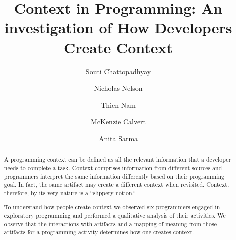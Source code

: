 \documentclass[sigconf]{acmart}
\begin{document}
\title{Context in Programming: An investigation of How Developers Create Context}

\author{Souti Chattopadhyay}

\author{Nicholas Nelson}

\author{Thien Nam}

\author{McKenzie Calvert}

\author{Anita Sarma}

\renewcommand{\shortauthors}{S. Chattopadhyay et al.}


\begin{abstract}
A programming context can be defined as all the relevant information that a developer needs to complete a task. Context comprises information from different sources and programmers interpret the same information differently based on their programming goal. In fact, the same artifact may create a different context when revisited. Context, therefore, by its very nature is a ``slippery notion.''

To understand how people create context we observed six programmers engaged in exploratory programming and performed a qualitative analysis of their activities. We observe that the interactions with artifacts and a mapping of meaning from those artifacts for a programming activity determines how one creates context.
\end{abstract}

%
%
\end{document}
